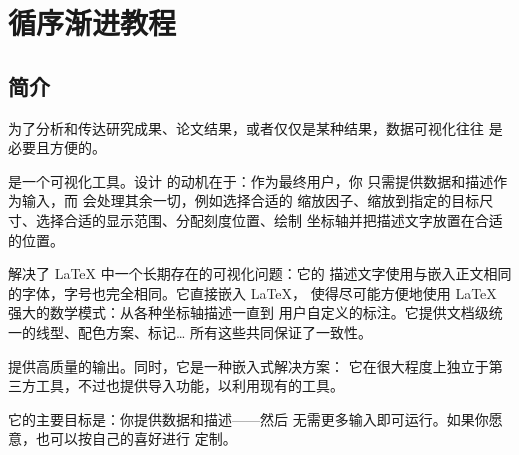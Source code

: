 
\chapter{循序渐进教程}
{%
%


\section{简介}

为了分析和传达研究成果、论文结果，或者仅仅是某种结果，数据可视化往往
是必要且方便的。

\PGFPlots{} 是一个可视化工具。设计 \PGFPlots{} 的动机在于：作为最终用户，你
只需提供数据和描述作为输入，而 \PGFPlots{} 会处理其余一切，例如选择合适的
缩放因子、缩放到指定的目标尺寸、选择合适的显示范围、分配刻度位置、绘制
坐标轴并把描述文字放置在合适的位置。

\PGFPlots{} 解决了 \LaTeX{} 中一个长期存在的可视化问题：它的
描述文字使用与嵌入正文相同的字体，字号也完全相同。它直接嵌入 \LaTeX{}，
使得尽可能方便地使用 \LaTeX{} 强大的数学模式：从各种坐标轴描述一直到
用户自定义的标注。它提供文档级统一的线型、配色方案、标记\ldots{}
所有这些共同保证了一致性。

\PGFPlots{} 提供高质量的输出。同时，它是一种嵌入式解决方案：
它在很大程度上独立于第三方工具，不过也提供导入功能，以利用现有的工具。

它的主要目标是：你提供数据和描述——然后
\PGFPlots{} 无需更多输入即可运行。如果你愿意，也可以按自己的喜好进行
定制。






}%
